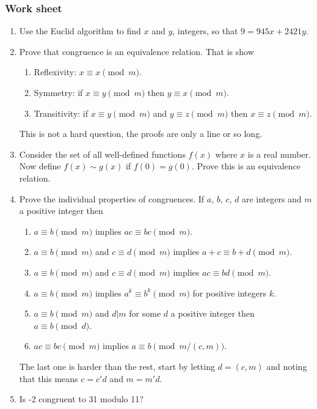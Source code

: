 \documentclass[12pt]{article}
\begin{document}
\subsubsection*{Work sheet}


\begin{enumerate}

\item Use the Euclid algorithm to find $x$ and $y$, integers, so that $9=945x+2421y$.

\item Prove that congruence is an equivalence relation. That is show
\begin{enumerate}
\item Reflexivity: $x\equiv x \pmod m$.
\item Symmetry: if $x\equiv y \pmod m$ then $y\equiv x \pmod m$.
\item Transitivity: if $x\equiv y \pmod m$ and
  $y\equiv z \pmod m$ then $x\equiv z \pmod m$.
\end{enumerate}
This is not a hard question, the proofs are only a line or so long.

\item Consider the set of all well-defined functions $f(x)$ where $x$
  is a real number. Now define $f(x)\sim g(x)$ if $f(0)=g(0)$. Prove
  this is an equivalence relation.

\item Prove the individual properties of congruences. If $a$, $b$,
  $c$, $d$ are integers and $m$ a positive integer then
\begin{enumerate}
\item $a\equiv b\pmod m$ implies $ac\equiv bc\pmod m$.
\item $a\equiv b\pmod m$ and $c\equiv d\pmod m$ implies $a+c\equiv b+d\pmod m$.
\item $a\equiv b\pmod m$ and $c\equiv d\pmod m$ implies $ac\equiv bd\pmod m$.
\item $a\equiv b\pmod m$ implies $a^k\equiv b^k\pmod m$ for positive integers $k$.
\item $a\equiv b\pmod m$ and $d|m$ for some $d$ a positive integer then $a\equiv b\pmod d$.
\item $ac\equiv bc\pmod m$ implies $a\equiv b\pmod {m/(c,m)}$.
\end{enumerate}
The last one is harder than the rest, start by letting $d=(c,m)$ and noting that this means $c=c'd$ and $m=m'd$.

\item Is -2 congruent to 31 modulo 11? 


\end{enumerate}
\end{document}
